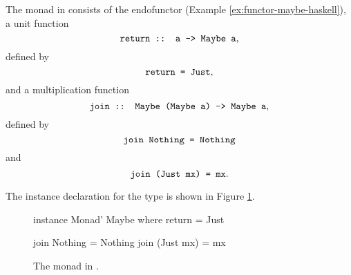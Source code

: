 \begin{example}
  \label{ex:monad-maybe-haskell}

  The  monad in \hask consists of the
   endofunctor (Example
  \ref{ex:functor-maybe-haskell}), a unit function
  \begin{equation*}
    \text{\texttt{return :: a -> Maybe a}}
    \text{,}
  \end{equation*}
  defined by
  \begin{equation}
    \label{eq:maybe-return}
    \text{\texttt{return = Just}}
    \text{,}
  \end{equation}
  and a multiplication function
  \begin{equation*}
    \text{\texttt{join :: Maybe (Maybe a) -> Maybe a}}
    \text{,}
  \end{equation*}
  defined by
  \begin{equation}
    \label{eq:maybe-join-nothing}
    \text{\texttt{join Nothing = Nothing}}
  \end{equation}
  and
  \begin{equation}
    \label{eq:maybe-join-just}
    \text{\texttt{join (Just mx) = mx}}
    \text{.}
  \end{equation}

  The  instance declaration for the
   type is shown in Figure
  \ref{fig:monad-maybe-haskell}.
  \begin{figure}[htbp]
    \begin{codehaskell}
instance Monad' Maybe where
  return = Just

  join Nothing   = Nothing
  join (Just mx) = mx
    \end{codehaskell}
    \caption{The  monad in \hask.}
    \label{fig:monad-maybe-haskell}
  \end{figure}


\end{example}
